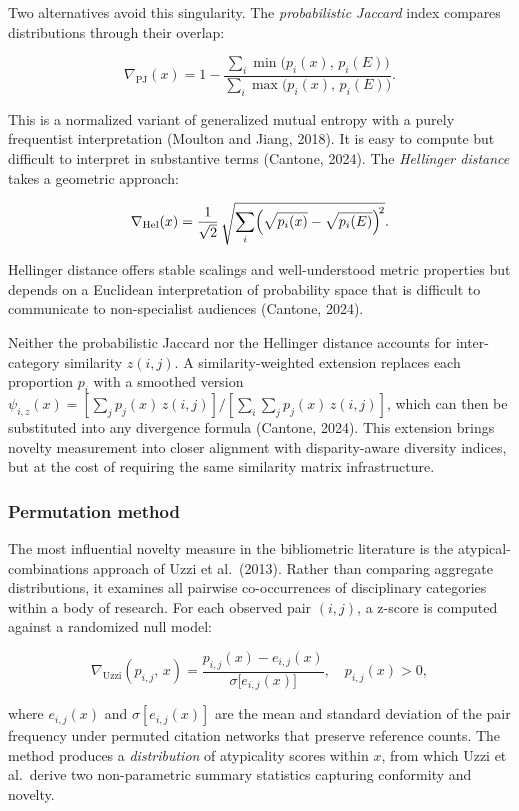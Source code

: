 \documentclass[
]{article}
\begin{document}
Two alternatives avoid this singularity. The \emph{probabilistic
Jaccard} index compares distributions through their overlap:

\[\nabla_{\mathrm{PJ}}(x) = 1 - \frac{\sum_i \min\!\bigl(p_i(x),\,
p_i(E)\bigr)}{\sum_i \max\!\bigl(p_i(x),\, p_i(E)\bigr)}.\]

This is a normalized variant of generalized mutual entropy with a purely
frequentist interpretation (Moulton and Jiang, 2018). It is easy to
compute but difficult to interpret in substantive terms (Cantone, 2024).
The \emph{Hellinger distance} takes a geometric approach:

\[\nabla_{\mathrm{Hel}}(x) = \frac{1}{\sqrt{2}}\,\sqrt{\sum_i \Bigl(
\sqrt{p_i(x)} - \sqrt{p_i(E)}\Bigr)^{\!2}}.\]

Hellinger distance offers stable scalings and well-understood metric
properties but depends on a Euclidean interpretation of probability
space that is difficult to communicate to non-specialist audiences
(Cantone, 2024).

Neither the probabilistic Jaccard nor the Hellinger distance accounts
for inter-category similarity \(z(i,j)\). A similarity-weighted
extension replaces each proportion \(p_i\) with a smoothed version
\(\psi_{i,z}(x) = [\sum_j p_j(x)\,z(i,j)] / [\sum_i \sum_j p_j(x)\,z(i,j)]\),
which can then be substituted into any divergence formula (Cantone,
2024). This extension brings novelty measurement into closer alignment
with disparity-aware diversity indices, but at the cost of requiring the
same similarity matrix infrastructure.

\hypertarget{permutation-method}{%
\subsubsection{Permutation method}\label{permutation-method}}

The most influential novelty measure in the bibliometric literature is
the atypical-combinations approach of Uzzi et al.~(2013). Rather than
comparing aggregate distributions, it examines all pairwise
co-occurrences of disciplinary categories within a body of research. For
each observed pair \((i,j)\), a z-score is computed against a randomized
null model:

\[\nabla_{\mathrm{Uzzi}}(p_{i,j},\, x) = \frac{p_{i,j}(x) - e_{i,j}(x)}
{\sigma\!\bigl[e_{i,j}(x)\bigr]}, \quad p_{i,j}(x) > 0,\]

where \(e_{i,j}(x)\) and \(\sigma[e_{i,j}(x)]\) are the mean and
standard deviation of the pair frequency under permuted citation
networks that preserve reference counts. The method produces a
\emph{distribution} of atypicality scores within \(x\), from which Uzzi
et al.~derive two non-parametric summary statistics capturing conformity
and novelty.
\end{document}
